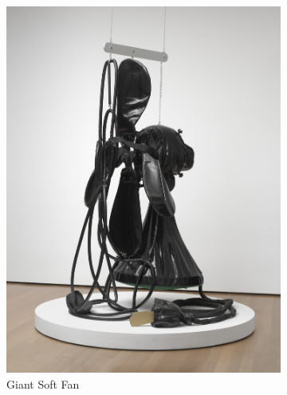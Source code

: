 \documentclass[12pt]{article}
\begin{document}
\begin{figure}
    \begin{subfigure}{0.5\textwidth}
    \includegraphics[height=.4\textheight]{fan1.jpeg}
        \centering
        \caption{Giant Soft Fan \autocite{pic2}}
        \label{subim1}
    \end{subfigure}
    \begin{subfigure}{0.5\textwidth}

\end{subfigure}
\end{figure}
\end{document}
